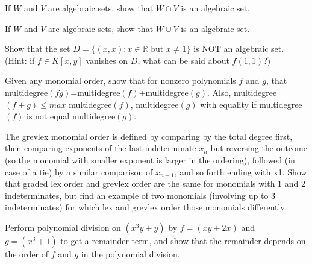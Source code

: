 \documentclass[12pt,letterpaper]{hmcpset}
\newcommand{\Rr}{\mathbb{R}}
\begin{document}

\begin{problem}[1.]
  If $W$ and $V$ are algebraic sets, show that $W \cap V$ is an algebraic set.
\end{problem}
\begin{solution}
  \vfill
\end{solution}
\newpage
\begin{problem}[2.]
  If $W$ and $V$ are algebraic sets, show that $W \cup V$ is an algebraic set.
\end{problem}
\begin{solution}
  \vfill
\end{solution}
\newpage
\begin{problem}[3.]
  Show that the set $D = \{(x,x) : x \in \Rr \text{ but } x \ne 1\}$ is NOT an algebraic set. (Hint: if $f \in K[x,y]$ vanishes on $D$, what can be said about $f(1,1)$?)
\end{problem}
\begin{solution}
  \vfill
\end{solution}
\newpage
\begin{problem}[4.]
  Given any monomial order, show that for nonzero polynomials $f$ and $g$, that multidegree$(fg)$=multidegree$(f)$+multidegree$(g)$.
  Also, multidegree$(f+g) \le max$ {multidegree$(f)$, multidegree$(g)$ } with equality if multidegree$(f)$ is not equal multidegree$(g)$.
\end{problem}
\begin{solution}
  \vfill
\end{solution}
\newpage
\begin{problem}[5.]
  The grevlex monomial order is defined by comparing by the total degree first, then comparing exponents of the last indeterminate $x_n$ but reversing the outcome (so the monomial with smaller exponent is larger in the ordering), followed (in case of a tie) by a similar comparison of $x_{n-1}$, and so forth ending with x1.  Show that graded lex order and grevlex order are the same for monomials with 1 and 2 indeterminates, but find an example of two monomials (involving up to 3 indeterminates) for which lex and grevlex order those monomials differently.
\end{problem}
\begin{solution}
  \vfill
\end{solution}
\newpage
\begin{problem}[6.]
  Perform polynomial division on $(x^3 y + y)$ by $f=(xy+2x)$ and  $g=(x^3+1)$ to get a remainder term, and show that the remainder depends on the order of $f$ and $g$ in the polynomial division.
\end{problem}
\end{document}
